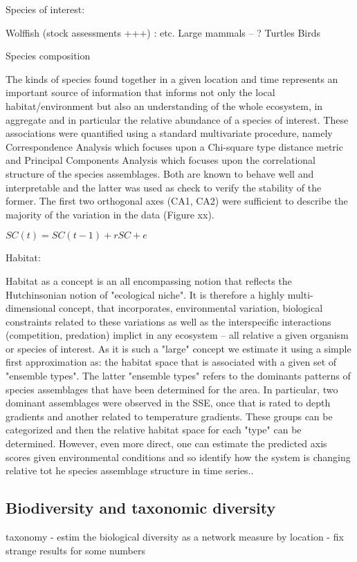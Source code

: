 \documentclass[letterpaper,portrait,11pt]{scrartcl}
\numberwithin{equation}{section}		%
\numberwithin{figure}{section}			%
\numberwithin{table}{section}				%
\begin{document}
\begin{itemize*}
Species of interest:

Wolffish (stock assessments +++) : 
etc.
Large mammals
-- ?
Turtles
Birds


Species composition 

The kinds of species found together in a given location and time represents an important source of information that informs not only the local habitat/environment but also an understanding of the whole ecosystem, in aggregate and in particular the relative abundance of a species of interest. These associations were quantified using a standard multivariate procedure, namely Correspondence Analysis which focuses upon a Chi-square type distance metric and Principal Components Analysis which focuses upon the correlational structure of the species assemblages. Both are known to behave well and interpretable and the latter was used as check to verify the stability of the former. The first two orthogonal axes (CA1, CA2) were sufficient to describe the majority of the variation in the data (Figure xx).

$ SC(t) = SC(t-1) + rSC + e $

Habitat:

Habitat as a concept is an all encompassing notion that reflects the Hutchinsonian notion of "ecological niche". It is therefore a highly multi-dimensional concept, that incorporates, environmental variation, biological constraints related to these variations as well as the interspecific interactions (competition, predation) implict in any ecosystem -- all relative a given organism or species of interest. As it is such a "large" concept we estimate it using a simple first approximation as: the habitat space that is associated with a given set of "ensemble types". The latter "ensemble types" refers to the dominants patterns of species assemblages that have been determined for the area. In particular, two dominant assemblages were observed in the SSE, once that is rated to depth gradients and another related to temperature gradients. These groups can be categorized and then the relative habitat space for each "type" can be determined. However, even more direct, one can estimate the predicted axis scores given environmental conditions and so identify how the system is changing relative tot he species assemblage structure in time series..




\subsection{Biodiversity and taxonomic diversity}
taxonomy
- estim the biological diversity as a network measure by location
- fix strange results for some numbers


\end{itemize*}
\end{document}
